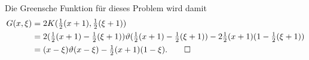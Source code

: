 \begin{loesung}
Die Greensche Funktion für dieses Problem wird damit
\begin{align*}
G(x,\xi)&=
2K({\textstyle\frac12}(x+1),{\textstyle\frac12}(\xi+1))
\\
&=
2
({\textstyle\frac12}(x+1)-\textstyle{\frac12}(\xi+1))
\vartheta({\textstyle\frac12}(x+1)-{\textstyle\frac12}(\xi+1))
-2{\textstyle\frac12}(x+1)(1-{\textstyle\frac12}(\xi+1))
\\
&=
(x-\xi)\vartheta(x-\xi)-{\textstyle\frac12}(x+1)(1-\xi).
\qedhere
\end{align*}
\end{loesung}

